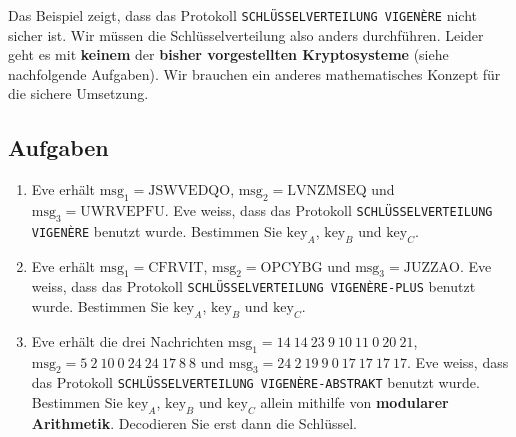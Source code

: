 Das Beispiel zeigt, dass das Protokoll \texttt{SCHLÜSSELVERTEILUNG VIGENÈRE} nicht sicher ist. Wir müssen die Schlüsselverteilung also anders durchführen. Leider geht es mit \textbf{keinem} der \textbf{bisher vorgestellten Kryptosysteme} (siehe nachfolgende Aufgaben). Wir brauchen ein anderes mathematisches Konzept für die sichere Umsetzung.

\subsection{Aufgaben}

\begin{enumerate}
	\item Eve erhält $\text{msg}_1 = \text{JSWVEDQO}$, $\text{msg}_2 = \text{LVNZMSEQ}$ und $\text{msg}_3 = \text{UWRVEPFU}$. Eve weiss, dass das Protokoll \texttt{SCHLÜSSELVERTEILUNG VIGENÈRE} benutzt wurde. Bestimmen Sie $\text{key}_A$, $\text{key}_B$ und $\text{key}_C$.


	\fillwithgrid{2in}

	\item Eve erhält $\text{msg}_1 = \text{CFRVIT}$, $\text{msg}_2 = \text{OPCYBG}$ und $\text{msg}_3 = \text{JUZZAO}$. Eve weiss, dass das Protokoll \texttt{SCHLÜSSELVERTEILUNG VIGENÈRE-PLUS} benutzt wurde. Bestimmen Sie $\text{key}_A$, $\text{key}_B$ und $\text{key}_C$.

	
	\fillwithgrid{2in}

	\item  Eve erhält die drei Nachrichten $\text{msg}_1 = 14~14~23~9~10~11~0~20~21$, $\text{msg}_2 = 5~2~10~0~24~24~17~8~8$ und $\text{msg}_3 = 24~2~19~9~0~17~17~17~17$. Eve weiss, dass das Protokoll \texttt{SCHLÜSSELVERTEILUNG VIGENÈRE-ABSTRAKT} benutzt wurde. Bestimmen Sie $\text{key}_A$, $\text{key}_B$ und $\text{key}_C$ allein mithilfe von \textbf{modularer Arithmetik}. Decodieren Sie erst dann die Schlüssel.

	
	
	\fillwithgrid{3in}
	

\end{enumerate}
